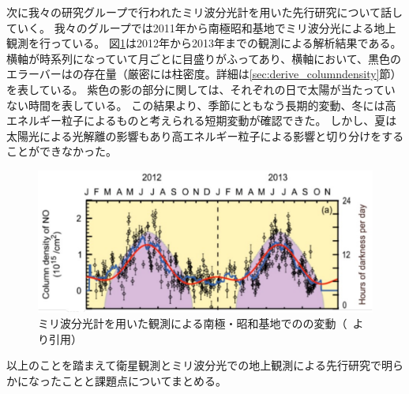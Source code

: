 次に我々の研究グループで行われたミリ波分光計を用いた先行研究について話していく。
我々のグループでは2011年から南極昭和基地でミリ波分光による地上観測を行っている。
図\ref{fig:isono2014ground_fig5a}は2012年から2013年までの観測による解析結果である。
横軸が時系列になっていて月ごとに目盛りがふってあり、横軸において、黒色のエラーバーはの存在量（厳密には柱密度。詳細は\ref{sec:derive_columndensity}節）を表している。
紫色の影の部分に関しては、それぞれの日で太陽が当たっていない時間を表している。
この結果より、季節にともなう長期的変動、冬には高エネルギー粒子によるものと考えられる短期変動が確認できた。
しかし、夏は太陽光による光解離の影響もあり高エネルギー粒子による影響と切り分けをすることができなかった。
\begin{figure}[htbp]
    \centering
    \includegraphics[width=\linewidth]{master_thesis_contents/master_thesis_fig/isono2014ground_fig5a.pdf}
    \caption{ミリ波分光計を用いた観測による南極・昭和基地でのの変動（~\cite{isono2014ground}より引用）}
    \label{fig:isono2014ground_fig5a}
\end{figure}
以上のことを踏まえて衛星観測とミリ波分光での地上観測による先行研究で明らかになったことと課題点についてまとめる。
